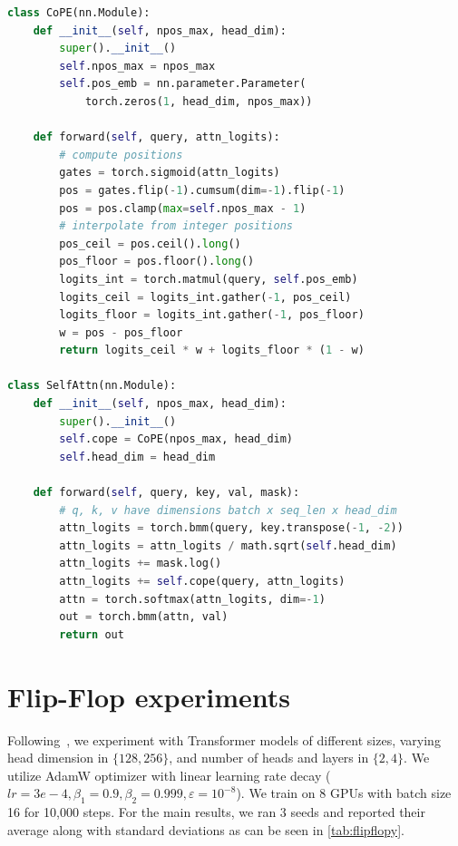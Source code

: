 \documentclass{article}
\begin{document}
\lstset{style=mystyle}
\begin{lstlisting}[language=Python, caption=CoPE attention code]
class CoPE(nn.Module):
    def __init__(self, npos_max, head_dim):
        super().__init__()
        self.npos_max = npos_max
        self.pos_emb = nn.parameter.Parameter(
            torch.zeros(1, head_dim, npos_max))

    def forward(self, query, attn_logits):
        # compute positions
        gates = torch.sigmoid(attn_logits)
        pos = gates.flip(-1).cumsum(dim=-1).flip(-1)
        pos = pos.clamp(max=self.npos_max - 1)
        # interpolate from integer positions
        pos_ceil = pos.ceil().long()
        pos_floor = pos.floor().long()
        logits_int = torch.matmul(query, self.pos_emb)
        logits_ceil = logits_int.gather(-1, pos_ceil)
        logits_floor = logits_int.gather(-1, pos_floor)
        w = pos - pos_floor
        return logits_ceil * w + logits_floor * (1 - w)

class SelfAttn(nn.Module):
    def __init__(self, npos_max, head_dim):
        super().__init__()
        self.cope = CoPE(npos_max, head_dim)
        self.head_dim = head_dim

    def forward(self, query, key, val, mask):
        # q, k, v have dimensions batch x seq_len x head_dim
        attn_logits = torch.bmm(query, key.transpose(-1, -2))
        attn_logits = attn_logits / math.sqrt(self.head_dim)
        attn_logits += mask.log()
        attn_logits += self.cope(query, attn_logits)
        attn = torch.softmax(attn_logits, dim=-1)
        out = torch.bmm(attn, val)
        return out
\end{lstlisting}

\section{Flip-Flop experiments}
\label{appendix:flipflop_details}

Following~\cite{liu2024exposing}, we experiment with Transformer models of different sizes, varying head dimension in $\{128, 256\}$, and number of heads and layers in $\{2,4\}$. We  utilize AdamW optimizer with linear learning rate decay ($lr=3e-4,\beta_1=0.9, \beta_2=0.999, \varepsilon=10^{-8}$). We train on 8 GPUs with batch size 16 for 10,000 steps.
For the main results, we ran 3 seeds and reported their average along with standard deviations as can be seen in \cref{tab:flipflopy}.
\end{document}
